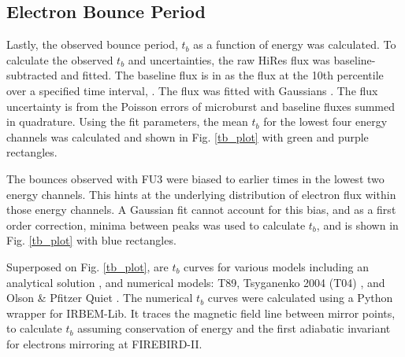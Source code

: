 \documentclass[draft, linenumbers]{agujournal}
\begin{document}
\subsection{Electron Bounce Period} \label{t_b} %
Lastly, the observed bounce period, $t_b$ as a function of energy was calculated. To calculate the observed $t_b$ and uncertainties, the raw HiRes flux was baseline-subtracted and fitted. The baseline flux  is  in \citet{O'Brien2004} as the flux at the 10th percentile over a specified time interval, . The flux was fitted with  Gaussians . The flux uncertainty is from the Poisson errors of microburst and baseline fluxes summed in quadrature. Using the fit parameters, the mean $t_b$ for the lowest four energy channels was calculated and shown in Fig. \ref{tb_plot} with green and purple rectangles. 

The bounces observed with FU3 were biased to earlier times in the lowest two energy channels. This hints at the underlying distribution of electron flux within those energy channels.  A Gaussian fit cannot account for this bias, and as a first order correction, minima between peaks was used to calculate $t_b$, and is shown in Fig. \ref{tb_plot} with blue rectangles. 

Superposed on Fig. \ref{tb_plot}, are $t_b$ curves for various models including an analytical solution  \citep{Schulz1974}, and numerical models: T89, Tsyganenko 2004 (T04) \citep{Tsyganenko2005}, and Olson \& Pfitzer Quiet \citep{Olson1982}. The numerical $t_b$ curves were calculated using a Python wrapper for IRBEM-Lib. It traces the magnetic field line between mirror points, to calculate $t_b$ assuming conservation of energy and the first adiabatic invariant for electrons mirroring at FIREBIRD-II. 
\end{document}
